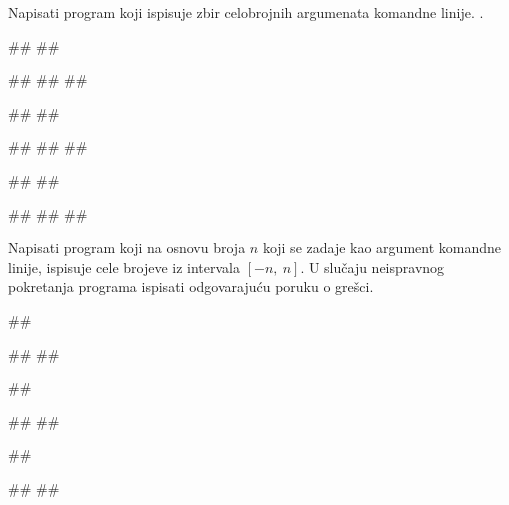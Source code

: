 \begin{Exercise}[label=p2.6_01] 
Napisati program koji ispisuje zbir celobrojnih argumenata komandne linije. 
.

\begin{minitest}
\begin{upotreba}{1}
#\naslovPokretanje#
##

#\naslovIzlaz#
##
##
\end{upotreba}
\end{minitest}
\begin{minitest}
\begin{upotreba}{2}
#\naslovPokretanje#
##

#\naslovIzlaz#
##
##
\end{upotreba}
\end{minitest}
\begin{minitest}
\begin{upotreba}{3}
#\naslovPokretanje#
##

#\naslovIzlaz#
##
##
\end{upotreba}
\end{minitest}
\end{Exercise}
\ifresenja
\begin{Answer}[ref=p2.6_01]
\end{Answer}
 \fi

 
\begin{Exercise}[label=p2.6_04] 
 Napisati program koji na osnovu broja $n$ koji se zadaje kao argument komandne 
 linije, ispisuje cele brojeve iz intervala $[-n,\ n]$.
 U slučaju neispravnog pokretanja programa ispisati odgovarajuću poruku o grešci.
 
\begin{minitest}
\begin{upotreba}{1}
##

#\naslovIzlaz#
##
\end{upotreba}
\end{minitest}
\begin{minitest}
\begin{upotreba}{2}
##

#\naslovIzlaz#
##
\end{upotreba}
\end{minitest}
\begin{minitest}
\begin{upotreba}{3}
##

#\naslovIzlaz#
##
\end{upotreba}
\end{minitest}

\end{Exercise}
\ifresenja
\begin{Answer}[ref=p2.6_04]
\sstrana
\end{Answer}
 \fi 
 

